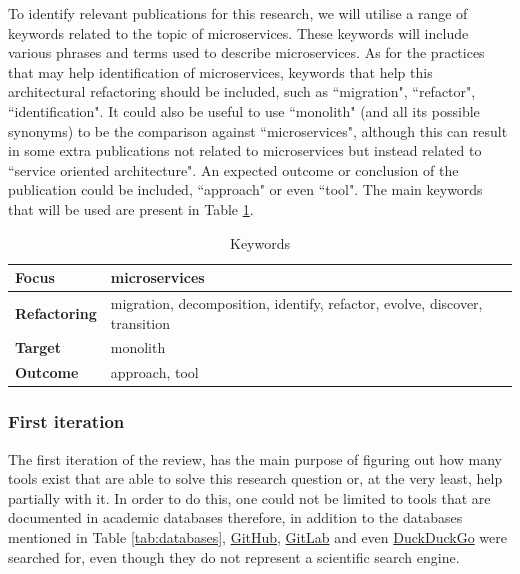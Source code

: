 \documentclass[conference]{IEEEtran}
\begin{document}
To identify relevant publications for this research, we will utilise a range of
keywords related to the topic of microservices. These keywords will include
various phrases and terms used to describe microservices. As for the practices
that may help identification of microservices, keywords that help this
architectural refactoring should be included, such as ``migration",
``refactor", ``identification". It could also be useful to use ``monolith" (and
all its possible synonyms) to be the comparison against ``microservices",
although this can result in some extra publications not related to
microservices but instead related to ``service oriented architecture". An
expected outcome or conclusion of the publication could be included,
``approach" or even ``tool". The main keywords that will be used are present in
Table \ref{tab:keywords}.

\begin{table}[!htb] \caption{Keywords} \label{tab:keywords}
  \begin{center}
    \begin{tabular}[c]{p{7em}|p{13em}} {\textbf{Focus}} & microservices \\
      \hline \textbf{Refactoring} & {migration, decomposition, identify, refactor, evolve, discover, transition } \\
      \hline \textbf{Target} & monolith \\
      \hline \textbf{Outcome} & approach, tool \\
    \end{tabular}
  \end{center}
\end{table}

\subsubsection*{First iteration} \label{subsub:first-iteration}

The first iteration of the review, has the main purpose of figuring out how many
tools exist that are able to solve this research question or, at the very
least, help partially with it. In order to do this, one could not be limited to
tools that are documented in academic databases therefore, in addition to the
databases mentioned in Table \ref{tab:databases},
\href{https://github.com}{GitHub}, \href{https://gitlab.com}{GitLab} and even
\href{https://duckduckgo.org}{DuckDuckGo} were searched for, even though they
do not represent a scientific search engine.
\end{document}
